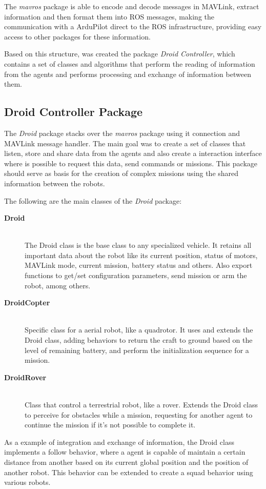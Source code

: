 The \emph{mavros} package is able to encode and decode messages in MAVLink, extract information and then format them into ROS messages, making the communication with a ArduPilot direct to the ROS infrastructure, providing easy access to other packages for these information.

Based on this structure, was created the package \emph{Droid Controller}, which contains a set of classes and algorithms that perform the reading of information from the agents and performs processing and exchange of information between them.


\subsection{Droid Controller Package} %
\label{sub:droid_controller_package}

The \emph{Droid} package stacks over the \emph{mavros} package using it connection and MAVLink message handler.
The main goal was to create a set of classes that listen, store and share data from the agents and also create a interaction interface where is possible to request this data, send commands or missions.
This package should serve as basis for the creation of complex missions using the shared information between the robots.

The following are the main classes of the \emph{Droid} package:

\begin{description}
  \item[\textbf{Droid}] \hfill \\
    The Droid class is the base class to any specialized vehicle.
    It retains all important data about the robot like its current position, status of motors, MAVLink mode, current mission, battery status and others.
    Also export functions to get/set configuration parameters, send mission or arm the robot, among others.
  \item[\textbf{DroidCopter}] \hfill \\
    Specific class for a aerial robot, like a quadrotor.
    It uses and extends the Droid class, adding behaviors to return the craft to ground based on the level of remaining battery, and perform the initialization sequence for a mission.
  \item[\textbf{DroidRover}] \hfill \\
    Class that control a terrestrial robot, like a rover.
    Extends the Droid class to perceive for obstacles while a mission, requesting for another agent to continue the mission if it's not possible to complete it.
\end{description}

As a example of integration and exchange of information, the Droid class implements a follow behavior, where a agent is capable of maintain a certain distance from another based on its current global position and the position of another robot.
This behavior can be extended to create a squad behavior using various robots.

